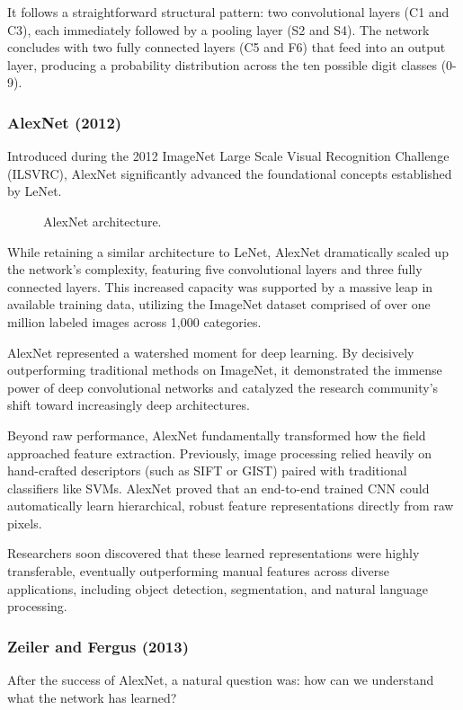It follows a straightforward structural pattern: two convolutional layers (C1 and C3), each immediately followed by a pooling layer (S2 and S4). The network concludes with two fully connected layers (C5 and F6) that feed into an output layer, producing a probability distribution across the ten possible digit classes (0-9).

\subsubsection{AlexNet (2012)}
Introduced during the 2012 ImageNet Large Scale Visual Recognition Challenge (ILSVRC), AlexNet significantly advanced the foundational concepts established by LeNet. 

\begin{figure}[H]
    \centering
    
    \caption{AlexNet architecture.}
    \label{fig:AlexNet}
\end{figure}

While retaining a similar architecture to LeNet, AlexNet dramatically scaled up the network's complexity, featuring five convolutional layers and three fully connected layers. 
This increased capacity was supported by a massive leap in available training data, utilizing the ImageNet dataset comprised of over one million labeled images across 1,000 categories.

AlexNet represented a watershed moment for deep learning. By decisively outperforming traditional methods on ImageNet, it demonstrated the immense power of deep convolutional networks and catalyzed the research community's shift toward increasingly deep architectures.

Beyond raw performance, AlexNet fundamentally transformed how the field approached feature extraction. Previously, image processing relied heavily on hand-crafted descriptors (such as SIFT or GIST) paired with traditional classifiers like SVMs. 
AlexNet proved that an end-to-end trained CNN could automatically learn hierarchical, robust feature representations directly from raw pixels. 

Researchers soon discovered that these learned representations were highly transferable, eventually outperforming manual features across diverse applications, 
including object detection, segmentation, and natural language processing.


\subsubsection{Zeiler and Fergus (2013)}
After the success of AlexNet, a natural question was: how can we understand what the network has learned?

